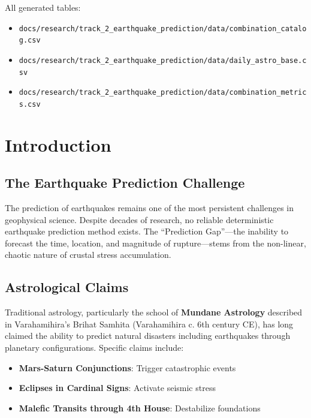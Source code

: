 \documentclass[
  11pt,
  a4paper,
  oneside,
  openany]{article}
\providecommand{\tightlist}{%
  \setlength{\itemsep}{0pt}\setlength{\parskip}{0pt}}\usepackage{longtable,booktabs,array}
\begin{document}
All generated tables:

\begin{itemize}
\tightlist
\item
  \texttt{docs/research/track\_2\_earthquake\_prediction/data/combination\_catalog.csv}
\item
  \texttt{docs/research/track\_2\_earthquake\_prediction/data/daily\_astro\_base.csv}
\item
  \texttt{docs/research/track\_2\_earthquake\_prediction/data/combination\_metrics.csv}
\end{itemize}

\section{Introduction}\label{introduction}

\subsection{The Earthquake Prediction
Challenge}\label{the-earthquake-prediction-challenge}

The prediction of earthquakes remains one of the most persistent
challenges in geophysical science. Despite decades of research, no
reliable deterministic earthquake prediction method exists. The
``Prediction Gap''---the inability to forecast the time, location, and
magnitude of rupture---stems from the non-linear, chaotic nature of
crustal stress accumulation.

\subsection{Astrological Claims}\label{astrological-claims}

Traditional astrology, particularly the school of \textbf{Mundane
Astrology} described in Varahamihira's Brihat Samhita (Varahamihira c.
6th century CE), has long claimed the ability to predict natural
disasters including earthquakes through planetary configurations.
Specific claims include:

\begin{itemize}
\tightlist
\item
  \textbf{Mars-Saturn Conjunctions}: Trigger catastrophic events
\item
  \textbf{Eclipses in Cardinal Signs}: Activate seismic stress
\item
  \textbf{Malefic Transits through 4th House}: Destabilize foundations
\end{itemize}
\end{document}
